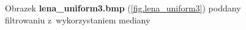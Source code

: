 \documentclass{classrep}
\begin{document}
\begin{figure}
{{  \label{fig.lena_uniform3_median_5x5}
 }
}
\caption{Obrazek \textbf{lena\_uniform3.bmp} (\ref{fig.lena_uniform3}) poddany filtrowaniu z~wykorzystaniem mediany}
\label{fig.lena_uniform3_median}
\end{figure}
\end{document}

